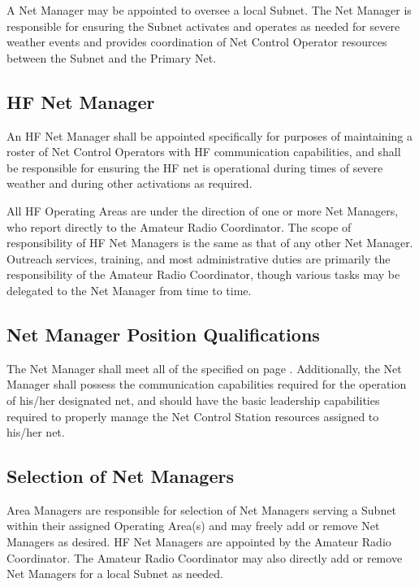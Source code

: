 \documentclass[pdflatex,letterpaper,twoside,12pt]{book}
\begin{document}
A Net Manager may be appointed to oversee a local Subnet.  The Net Manager is responsible for ensuring the Subnet activates and operates as needed for severe weather events and provides coordination of Net Control Operator resources between the Subnet and the Primary Net.

\subsection{HF Net Manager}

An HF Net Manager shall be appointed specifically for purposes of maintaining a roster of Net Control Operators with HF communication capabilities, and shall be responsible for ensuring the HF net is operational during times of severe weather and during other activations as required.

All HF Operating Areas are under the direction of one or more Net Managers, who report directly to the Amateur Radio Coordinator.  The scope of responsibility of HF Net Managers is the same as that of any other Net Manager.  Outreach services, training, and most administrative duties are primarily the responsibility of the Amateur Radio Coordinator, though various tasks may be delegated to the Net Manager from time to time.

\subsection{Net Manager Position Qualifications}

The Net Manager shall meet all of the  specified on page \pageref{nco-criteria}.  Additionally, the Net Manager shall possess the communication capabilities required for the operation of his/her designated net, and should have the basic leadership capabilities required to properly manage the Net Control Station resources assigned to his/her net.

\subsection{Selection of Net Managers}

Area Managers are responsible for selection of Net Managers serving a Subnet within their assigned Operating Area(s) and may freely add or remove Net Managers as desired.  HF Net Managers are appointed by the Amateur Radio Coordinator.  The Amateur Radio Coordinator may also directly add or remove Net Managers for a local Subnet as needed.
\end{document}
